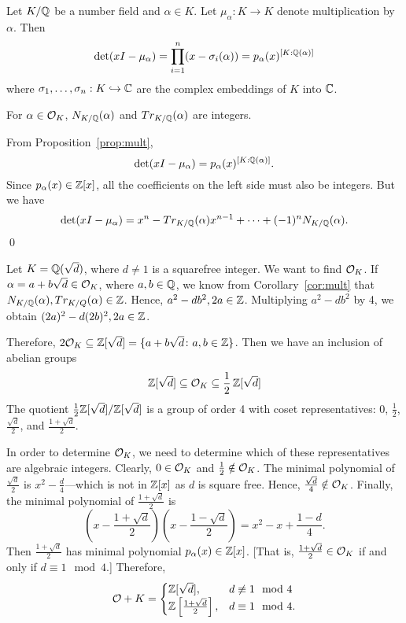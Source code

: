 \begin{prop}\label{prop:mult}
Let $K/\mathbb{Q}$ be a number field and $\alpha \in K$. Let $\mu_\alpha: K \to K$ denote multiplication by $\alpha$. Then
	\[
	\det(xI - \mu_\alpha)= \prod_{i=1}^n (x - \sigma_i(\alpha))= p_\alpha(x)^{[K:\mathbb{Q}(\alpha)]}
	\]
where $\sigma_1,\ldots,\sigma_n: K \hookrightarrow \mathbb{C}$ are the complex embeddings of $K$ into $\mathbb{C}$.
\end{prop}

\begin{cor}\label{cor:mult}
For $\alpha \in \mathcal{O}_K$, $N_{K/\mathbb{Q}}(\alpha)$ and $Tr_{K/\mathbb{Q}}(\alpha)$ are integers.
\end{cor}

\pf From Proposition~\ref{prop:mult}, 
	\[
	\det(xI - \mu_\alpha)= p_\alpha(x)^{[K:\mathbb{Q}(\alpha)]}.
	\]
Since $p_\alpha(x) \in \mathbb{Z}[x]$, all the coefficients on the left side must also be integers. But we have
	\[
	\det(xI-\mu_\alpha)=x^n - Tr_{K/\mathbb{Q}}(\alpha)x^{n-1} + \cdots + (-1)^n N_{K/\mathbb{Q}}(\alpha).
	\] \qed \\


\begin{ex}
Let $K=\mathbb{Q}(\sqrt{d})$, where $d\neq 1$ is a squarefree integer. We want to find $\mathcal{O}_K$. If $\alpha=a+b\sqrt{d} \in \mathcal{O}_K$, where $a,b \in \mathbb{Q}$, we know from Corollary~\ref{cor:mult} that $N_{K/\mathbb{Q}}(\alpha),Tr_{K/Q}(\alpha) \in \mathbb{Z}$. Hence, $a^2-db^2,2a \in \mathbb{Z}$. Multiplying $a^2-db^2$ by 4, we obtain $(2a)^2-d(2b)^2,2a \in \mathbb{Z}$. 

Therefore, $2\mathcal{O}_K \subseteq \mathbb{Z}[\sqrt{d}]=\{a+b\sqrt{d} \colon a,b \in \mathbb{Z}\}$. Then we have an inclusion of abelian groups
	\[
	\mathbb{Z}[\sqrt{d}] \subseteq \mathcal{O}_K \subseteq \dfrac{1}{2}\, \mathbb{Z}[\sqrt{d}]
	\]
The quotient $\frac{1}{2}\mathbb{Z}[\sqrt{d}]/\mathbb{Z}[\sqrt{d}]$ is a group of order 4 with coset representatives: 0, $\frac{1}{2}$, $\frac{\sqrt{d}}{2}$, and $\frac{1+\sqrt{d}}{2}$. 

In order to determine $\mathcal{O}_K$, we need to determine which of these representatives are algebraic integers. Clearly, $0 \in \mathcal{O}_K$ and $\frac{1}{2} \notin \mathcal{O}_K$. The minimal polynomial of $\frac{\sqrt{d}}{2}$ is $x^2 - \frac{d}{4}$---which is not in $\mathbb{Z}[x]$ as $d$ is square free. Hence, $\frac{\sqrt{d}}{4} \notin \mathcal{O}_K$. Finally, the minimal polynomial of $\frac{1+\sqrt{d}}{2}$ is
	\[
	\left(x - \dfrac{1+\sqrt{d}}{2}\right) \left(x - \dfrac{1-\sqrt{d}}{2}\right)= x^2-x+ \dfrac{1-d}{4}.
	\]
Then $\frac{1+\sqrt{d}}{2}$ has minimal polynomial $p_\alpha(x) \in \mathbb{Z}[x]$. [That is, $\frac{1+\sqrt{d}}{2} \in \mathcal{O}_K$ if and only if $d \equiv 1 \mod 4$.] Therefore,
	\[
	\mathcal{O}+K=
	\begin{cases}
	\mathbb{Z}[\sqrt{d}], & d \not\equiv 1 \mod 4 \\
	\mathbb{Z}\left[\frac{1+\sqrt{d}}{2}\right], & d \equiv 1 \mod 4.
	\end{cases}
	\]
\xqed
\end{ex}


